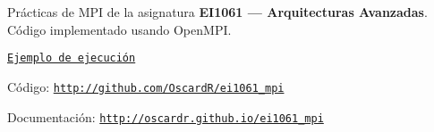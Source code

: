 Prácticas de M\-P\-I de la asignatura {\bfseries E\-I1061 — Arquitecturas Avanzadas}. Código implementado usando Open\-M\-P\-I.


\begin{DoxyItemize}
\item \href{USAGE.md}{\tt Ejemplo de ejecución}
\end{DoxyItemize}


\begin{DoxyItemize}
\item Código\-: \href{http://github.com/OscardR/ei1061_mpi}{\tt http\-://github.\-com/\-Oscard\-R/ei1061\-\_\-mpi}
\end{DoxyItemize}


\begin{DoxyItemize}
\item Documentación\-: \href{http://oscardr.github.io/ei1061_mpi}{\tt http\-://oscardr.\-github.\-io/ei1061\-\_\-mpi} 
\end{DoxyItemize}